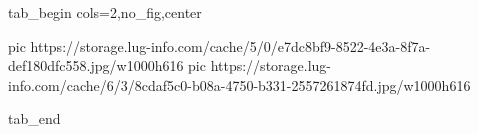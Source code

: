  
 
 
 
 


\ifcmt
  tab_begin cols=2,no_fig,center

     pic https://storage.lug-info.com/cache/5/0/e7dc8bf9-8522-4e3a-8f7a-def180dfc558.jpg/w1000h616%
		 pic https://storage.lug-info.com/cache/6/3/8cdaf5c0-b08a-4750-b331-2557261874fd.jpg/w1000h616%

  tab_end
\fi
